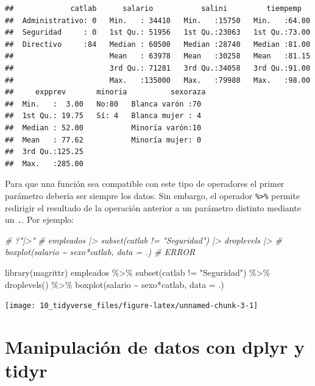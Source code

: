 \documentclass[
]{book}
\newenvironment{Shaded}{\begin{snugshade}}{\end{snugshade}}
\newcommand{\AttributeTok}[1]{\textcolor[rgb]{0.77,0.63,0.00}{#1}}
\newcommand{\CommentTok}[1]{\textcolor[rgb]{0.56,0.35,0.01}{\textit{#1}}}
\newcommand{\FunctionTok}[1]{\textcolor[rgb]{0.00,0.00,0.00}{#1}}
\newcommand{\NormalTok}[1]{#1}
\newcommand{\SpecialCharTok}[1]{\textcolor[rgb]{0.00,0.00,0.00}{#1}}
\newcommand{\StringTok}[1]{\textcolor[rgb]{0.31,0.60,0.02}{#1}}
\theoremstyle{break}
\theoremstyle{nonumberplain}
\begin{document}
\begin{verbatim}
##             catlab      salario           salini         tiempemp    
##  Administrativo: 0   Min.   : 34410   Min.   :15750   Min.   :64.00  
##  Seguridad     : 0   1st Qu.: 51956   1st Qu.:23063   1st Qu.:73.00  
##  Directivo     :84   Median : 60500   Median :28740   Median :81.00  
##                      Mean   : 63978   Mean   :30258   Mean   :81.15  
##                      3rd Qu.: 71281   3rd Qu.:34058   3rd Qu.:91.00  
##                      Max.   :135000   Max.   :79980   Max.   :98.00  
##     expprev       minoria          sexoraza 
##  Min.   :  3.00   No:80   Blanca varón :70  
##  1st Qu.: 19.75   Sí: 4   Blanca mujer : 4  
##  Median : 52.00           Minoría varón:10  
##  Mean   : 77.62           Minoría mujer: 0  
##  3rd Qu.:125.25                             
##  Max.   :285.00
\end{verbatim}

Para que una función sea compatible con este tipo de operadores el primer parámetro debería ser siempre los datos.
Sin embargo, el operador \texttt{\%\textgreater{}\%} permite redirigir el resultado de la operación anterior a un parámetro distinto mediante un \texttt{.}.
Por ejemplo:

\begin{Shaded}
\begin{Highlighting}[]
\CommentTok{\# ?"|\textgreater{}"}
\CommentTok{\# empleados |\textgreater{} subset(catlab != "Seguridad") |\textgreater{} droplevels |\textgreater{} }
\CommentTok{\#     boxplot(salario \textasciitilde{} sexo*catlab, data = .) \# ERROR}

\FunctionTok{library}\NormalTok{(magrittr)}
\NormalTok{empleados }\SpecialCharTok{\%\textgreater{}\%} \FunctionTok{subset}\NormalTok{(catlab }\SpecialCharTok{!=} \StringTok{"Seguridad"}\NormalTok{) }\SpecialCharTok{\%\textgreater{}\%} \FunctionTok{droplevels}\NormalTok{() }\SpecialCharTok{\%\textgreater{}\%}
    \FunctionTok{boxplot}\NormalTok{(salario }\SpecialCharTok{\textasciitilde{}}\NormalTok{ sexo}\SpecialCharTok{*}\NormalTok{catlab, }\AttributeTok{data =}\NormalTok{ .)}
\end{Highlighting}
\end{Shaded}

\begin{center}\texttt{[image: 10\_tidyverse\_files/figure-latex/unnamed-chunk-3-1]} \end{center}

\hypertarget{dplyr}{%
\chapter{Manipulación de datos con dplyr y tidyr}\label{dplyr}}
\end{document}
